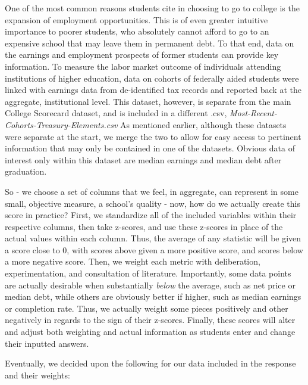 \documentclass{article}\usepackage[]{graphicx}\usepackage[]{color}
\begin{document}
One of the most common reasons students cite in choosing to go to college is the expansion of employment opportunities. This is of even greater intuitive importance to poorer students, who absolutely cannot afford to go to an expensive school that may leave them in permanent debt. To that end, data on the earnings and employment prospects of former students can provide key information. To measure the labor market outcome of individuals attending institutions of higher education, data on cohorts of federally aided students were linked with earnings data from de-identified tax records and reported back at the aggregate, institutional level. This dataset, however, is separate from the main College Scorecard dataset, and is included in a different .csv, \emph{Most-Recent-Cohorts-Treasury-Elements.csv} As mentioned earlier, although these datasets were separate at the start, we merge the two to allow for easy access to pertinent information that may only be contained in one of the datasets. Obvious data of interest only within this dataset are median earnings and median debt after graduation.\newline

So - we choose a set of columns that we feel, in aggregate, can represent in some small, objective measure, a school's quality - now, how do we actually create this score in practice? First, we standardize all of the included variables within their respective columns, then take z-scores, and use these z-scores in place of the actual values within each column. Thus, the average of any statistic will be given a score close to 0, with scores above given a more positive score, and scores below a more negative score. Then, we weight each metric with deliberation, experimentation, and consultation of literature. Importantly, some data points are actually desirable when substantially \emph{below} the average, such as net price or median debt, while others are obviously better if higher, such as median earnings or completion rate. Thus, we actually weight some pieces positively and other negatively in regards to the sign of their z-scores. Finally, these scores will alter and adjust both weighting and actual information as students enter and change their inputted answers. \newline

Eventually, we decided upon the following for our data included in the response and their weights:\newline
\end{document}
